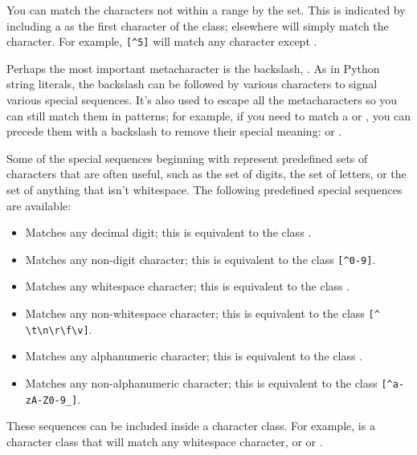 \documentclass{howto}
\begin{document}
You can match the characters not within a range by 
the set.  This is indicated by including a \character{\^} as the first
character of the class; \character{\^} elsewhere will simply match the
\character{\^} character.  For example, \verb|[^5]| will match any
character except .

Perhaps the most important metacharacter is the backslash, \samp{\e}.  
As in Python string literals, the backslash can be followed by various
characters to signal various special sequences.  It's also used to escape
all the metacharacters so you can still match them in patterns; for
example, if you need to match a \samp{[} or 
\samp{\e}, you can precede them with a backslash to remove their
special meaning: \regexp{\e[} or \regexp{\e\e}.

Some of the special sequences beginning with \character{\e} represent
predefined sets of characters that are often useful, such as the set
of digits, the set of letters, or the set of anything that isn't
whitespace.  The following predefined special sequences are available:

\begin{itemize}
\item[\code{\e d}]Matches any decimal digit; this is
equivalent to the class \regexp{[0-9]}.

\item[\code{\e D}]Matches any non-digit character; this is
equivalent to the class \verb|[^0-9]|.

\item[\code{\e s}]Matches any whitespace character; this is
equivalent to the class \regexp{[ \e t\e n\e r\e f\e v]}.

\item[\code{\e S}]Matches any non-whitespace character; this is
equivalent to the class \verb|[^ \t\n\r\f\v]|.

\item[\code{\e w}]Matches any alphanumeric character; this is equivalent to the class
\regexp{[a-zA-Z0-9_]}.  

\item[\code{\e W}]Matches any non-alphanumeric character; this is equivalent to the class
\verb|[^a-zA-Z0-9_]|.   
\end{itemize}

These sequences can be included inside a character class.  For
example, \regexp{[\e s,.]} is a character class that will match any
whitespace character, or \character{,} or .
\end{document}
